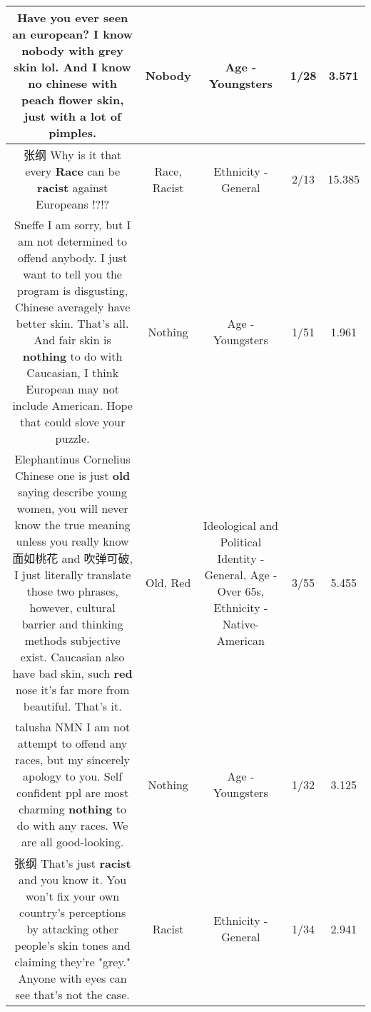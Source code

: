 \documentclass[11pt]{article}
\newlength\mylength
\begin{document}
\begin{center}
\begin{longtable}{|C{.65\mylength}|C{.30\mylength}|C{.12\mylength}|C{.12\mylength}|C{.12\mylength}|}
  \small Have you ever seen an european? I know \textbf{nobody} with grey skin lol. And I know no chinese with peach flower skin, just with a lot of pimples.\normalsize   & Nobody & Age - Youngsters & 1/28 & 3.571 \\  \hline
  \small 张纲 Why is it that every \textbf{Race} can be \textbf{racist} against Europeans !?!?\normalsize   & Race, Racist & Ethnicity - General & 2/13 & 15.385 \\  \hline
  \small Sneffe I am sorry, but I am not determined to offend anybody. I just want to tell you the program is disgusting, Chinese averagely have better skin. That's all. And fair skin is \textbf{nothing} to do with Caucasian, I think European may not include American. Hope that could slove your puzzle.\normalsize   & Nothing & Age - Youngsters & 1/51 & 1.961 \\  \hline
  \small Elephantinus Cornelius Chinese one is just \textbf{old} saying describe young women, you will never know the true meaning unless you really know 面如桃花 and 吹弹可破, I just literally translate those two phrases, however, cultural barrier and thinking methods subjective exist. Caucasian also have bad skin, such  \textbf{r\textbf{ed}} nose it's far more from beautiful. That's it.\normalsize   & Old, Red &  Ideological and Political Identity - General, Age - Over 65s, Ethnicity - Native-American & 3/55 & 5.455 \\  \hline
  \small talusha NMN I  am not attempt to offend any races, but my sincerely apology to you. Self confident ppl are most charming \textbf{nothing} to do with any races. We are all good-looking.\normalsize   & Nothing & Age - Youngsters & 1/32 & 3.125 \\  \hline
  \small 张纲 That's just \textbf{racist} and you know it. You won't fix your own country's perceptions by attacking other people's skin tones and claiming they're "grey." Anyone with eyes can see that's not the case.\normalsize   & Racist & Ethnicity - General & 1/34 & 2.941 \\  \hline

\end{longtable}
\end{center}
\end{document}

